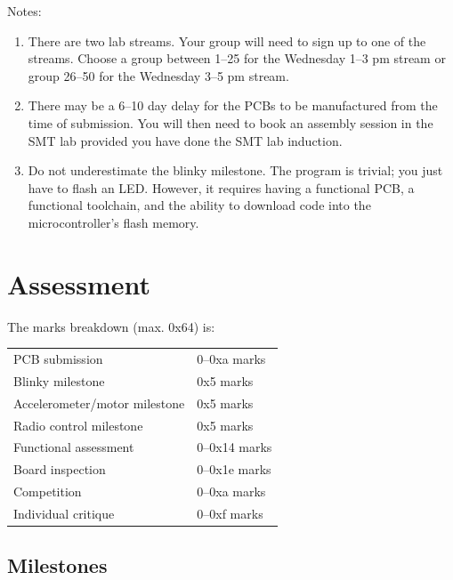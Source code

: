 \documentclass[11pt, a4paper]{article}
\begin{document}
Notes:
%
\begin{enumerate}
\item There are two lab streams.  Your group will need to sign up to
  one of the streams.  Choose a group between 1--25 for the Wednesday
  1--3 pm stream or group 26--50 for the Wednesday 3--5 pm stream.

\item There may be a 6--10 day delay for the PCBs to be manufactured
  from the time of submission.  You will then need to book an assembly
  session in the SMT lab provided you have done the SMT lab induction.

\item Do not underestimate the blinky milestone.  The program is
  trivial; you just have to flash an LED.  However, it requires having
  a functional PCB, a functional toolchain, and the ability to
  download code into the microcontroller's flash memory.

\end{enumerate}


\section{Assessment}

The marks breakdown (max. 0x64) is:
%
\begin{flushleft}
  \begin{tabular}{ll}
    PCB submission & 0--0xa marks\\
    Blinky milestone  & 0x5 marks\\
    Accelerometer/motor milestone  & 0x5 marks\\
    Radio control milestone  & 0x5 marks\\
    Functional assessment & 0--0x14 marks \\
    Board inspection & 0--0x1e marks \\
    Competition & 0--0xa marks \\
    Individual critique & 0--0xf marks \\
  \end{tabular}

\end{flushleft}

\subsection{Milestones}
\end{document}
